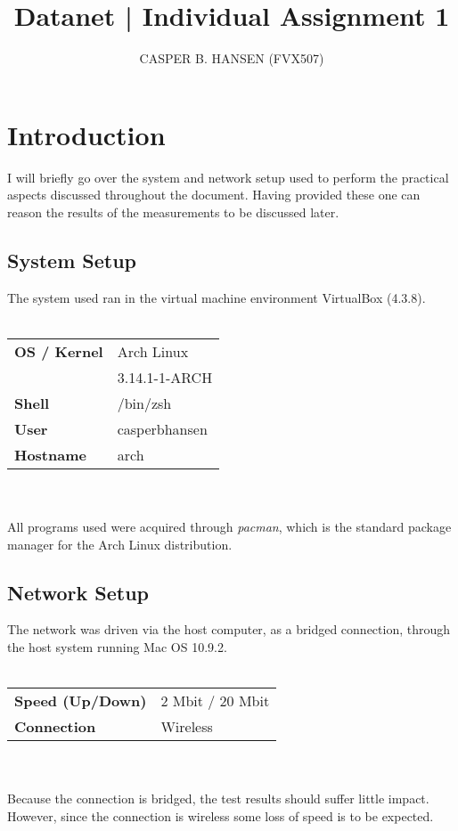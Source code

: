 \documentclass[prodmode,acmtoit]{acmsmall}
\title{Datanet | Individual Assignment 1}
\author{CASPER B. HANSEN (FVX507) \affil{University of Copenhagen}}
\begin{document}
\maketitle

\section{Introduction}
\label{sec:introduction}
I will briefly go over the system and network setup used to perform the
practical aspects discussed throughout the document. Having provided these one
can reason the results of the measurements to be discussed later.

\begin{multicols}{2}

    \subsection{System Setup}
    \label{sec:introduction|sub:system-setup}
    The system used ran in the virtual machine environment VirtualBox (4.3.8).
    \\\\
    \begin{tabular}{ll}
        {\bf OS / Kernel}   & Arch Linux \\
        {\bf }              & 3.14.1-1-ARCH \\
        {\bf Shell}         & /bin/zsh \\
        {\bf User}          & casperbhansen \\
        {\bf Hostname}      & arch \\
    \end{tabular}
    \\\\
    All programs used were acquired through {\it pacman}, which is the
    standard package manager for the Arch Linux distribution.
    
    \columnbreak

    \subsection{Network Setup}
    \label{sec:introduction|sub:network-setup}
    The network was driven via the host computer, as a bridged connection,
    through the host system running Mac OS 10.9.2.
    \\\\
    \begin{tabular}{ll}
        {\bf Speed (Up/Down)}   & 2 Mbit / 20 Mbit \\
        {\bf Connection}        & Wireless \\
    \end{tabular}
    \\\\
    Because the connection is bridged, the test results should suffer little
    impact. However, since the connection is wireless some loss of speed is
    to be expected.

\end{multicols}
\end{document}

